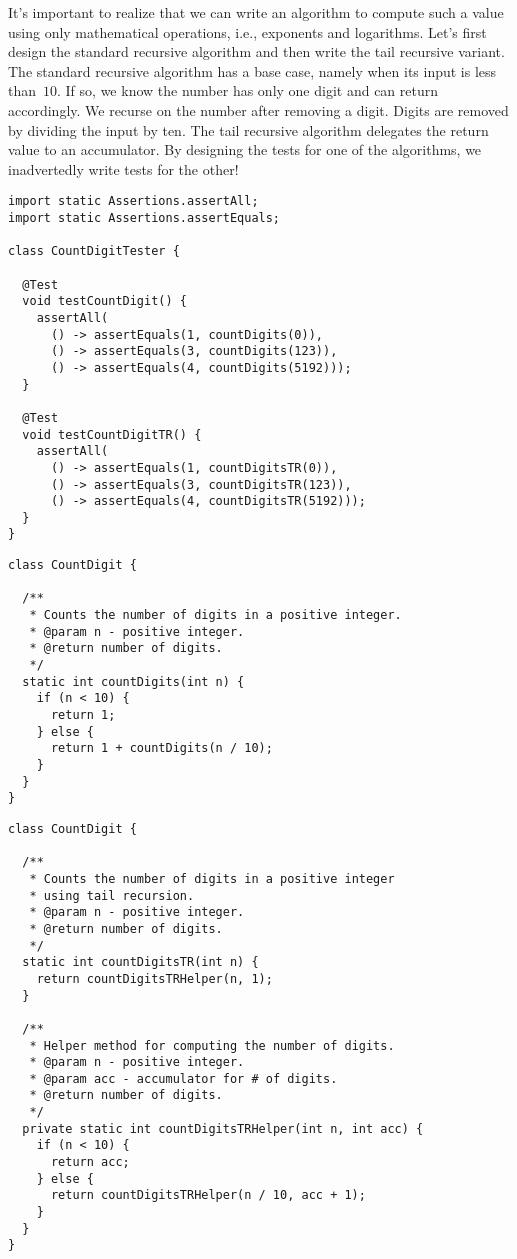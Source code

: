 It's important to realize that we can write an algorithm to compute such a value using only mathematical operations, i.e., exponents and logarithms.
Let's first design the standard recursive algorithm and then write the tail recursive variant.
The standard recursive algorithm has a base case, namely when its input is less than~$10$. If so, we know the number has only one digit and can return accordingly.
We recurse on the number after removing a digit.
Digits are removed by dividing the input by ten.
The tail recursive algorithm delegates the return value to an accumulator.
By designing the tests for one of the algorithms, we inadvertedly write tests for the other!

\enlargethispage{-2\baselineskip}
\begin{lstlisting}[language=MyJava]
import static Assertions.assertAll;
import static Assertions.assertEquals;

class CountDigitTester {

  @Test
  void testCountDigit() {
    assertAll(
      () -> assertEquals(1, countDigits(0)),
      () -> assertEquals(3, countDigits(123)),
      () -> assertEquals(4, countDigits(5192)));
  }

  @Test
  void testCountDigitTR() {
    assertAll(
      () -> assertEquals(1, countDigitsTR(0)),
      () -> assertEquals(3, countDigitsTR(123)),
      () -> assertEquals(4, countDigitsTR(5192)));
  }
}
\end{lstlisting}

\begin{lstlisting}[language=MyJava]
class CountDigit {

  /**
   * Counts the number of digits in a positive integer.
   * @param n - positive integer.
   * @return number of digits.
   */
  static int countDigits(int n) {
    if (n < 10) {
      return 1;
    } else {
      return 1 + countDigits(n / 10);
    }
  }
}
\end{lstlisting}

\begin{lstlisting}[language=MyJava]
class CountDigit {

  /**
   * Counts the number of digits in a positive integer
   * using tail recursion.
   * @param n - positive integer.
   * @return number of digits.
   */
  static int countDigitsTR(int n) {
    return countDigitsTRHelper(n, 1);
  }

  /**
   * Helper method for computing the number of digits.
   * @param n - positive integer.
   * @param acc - accumulator for # of digits.
   * @return number of digits.
   */
  private static int countDigitsTRHelper(int n, int acc) {
    if (n < 10) {
      return acc;
    } else {
      return countDigitsTRHelper(n / 10, acc + 1);
    }
  }
}
\end{lstlisting}

